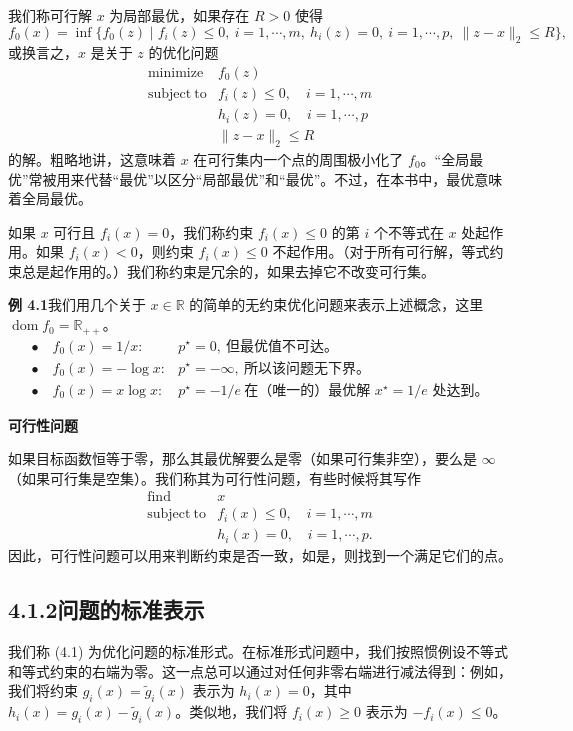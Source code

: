 \documentclass[UTF8, 12pt, fontset=fandol, oneside]{ctexart}
\begin{document}
我们称可行解 $x$ 为局部最优，如果存在 $R>0$ 使得
\[
f_0(x)=\inf\{f_0(z)\mid f_i(z)\leq 0,\ i=1,\cdots,m,\ h_i(z)=0,\ i=1,\cdots,p,\ \|z-x\|_2\leq R\},
\]
或换言之，$x$ 是关于 $z$ 的优化问题
\[
\begin{array}{ll}
\mathop{\mathrm{minimize}} & f_0(z)\\
\mathrm{subject\ to} & f_i(z)\leq 0,\quad i=1,\cdots,m\\
& h_i(z)=0,\quad i=1,\cdots,p\\
& \|z-x\|_2\leq R
\end{array}
\]
的解。粗略地讲，这意味着 $x$ 在可行集内一个点的周围极小化了 $f_0$。“全局最优”常被用来代替“最优”以区分“局部最优”和“最优”。不过，在本书中，最优意味着全局最优。

如果 $x$ 可行且 $f_i(x)=0$，我们称约束 $f_i(x)\leq 0$ 的第 $i$ 个不等式在 $x$ 处起作用。如果 $f_i(x)<0$，则约束 $f_i(x)\leq 0$ 不起作用。（对于所有可行解，等式约束总是起作用的。）我们称约束是冗余的，如果去掉它不改变可行集。

\noindent\textbf{例 4.1}\quad 我们用几个关于 $x\in\mathbb{R}$ 的简单的无约束优化问题来表示上述概念，这里 $\operatorname{dom} f_0=\mathbb{R}_{++}$。
\[
\begin{array}{ll}
\bullet\quad f_0(x)=1/x: & p^\star=0,\ \text{但最优值不可达。}\\
\bullet\quad f_0(x)=-\log x: & p^\star=-\infty,\ \text{所以该问题无下界。}\\
\bullet\quad f_0(x)=x\log x: & p^\star=-1/e\ \text{在（唯一的）最优解 }x^\star=1/e\text{ 处达到。}
\end{array}
\]

\noindent\textbf{可行性问题}

如果目标函数恒等于零，那么其最优解要么是零（如果可行集非空），要么是 $\infty$（如果可行集是空集）。我们称其为可行性问题，有些时候将其写作
\[
\begin{array}{ll}
\mathop{\mathrm{find}} & x\\
\mathrm{subject\ to} & f_i(x)\leq 0,\quad i=1,\cdots,m\\
& h_i(x)=0,\quad i=1,\cdots,p.
\end{array}
\]
因此，可行性问题可以用来判断约束是否一致，如是，则找到一个满足它们的点。

\subsection*{4.1.2\quad 问题的标准表示}

我们称 (4.1) 为优化问题的标准形式。在标准形式问题中，我们按照惯例设不等式和等式约束的右端为零。这一点总可以通过对任何非零右端进行减法得到：例如，我们将约束 $g_i(x)=\tilde{g}_i(x)$ 表示为 $h_i(x)=0$，其中 $h_i(x)=g_i(x)-\tilde{g}_i(x)$。类似地，我们将 $f_i(x)\geq 0$ 表示为 $-f_i(x)\leq 0$。
\end{document}
